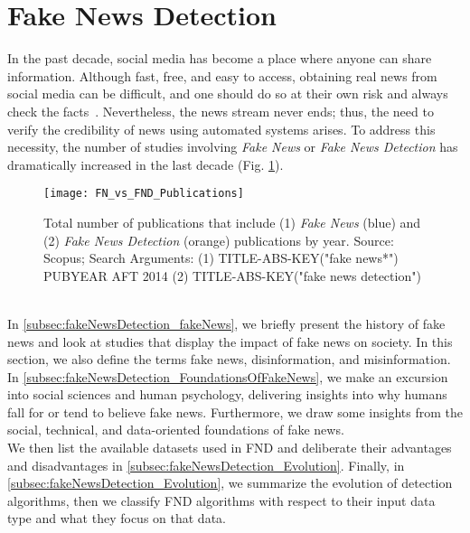 \section{Fake News Detection}
\label{sec:fakeNewsDetection}
In the past decade, social media has become a place where anyone can share information. Although fast, free, and easy to access, obtaining real news from social media can be difficult, and one should do so at their own risk and always check the facts~\parencite{SocialMediaAndFakeNewsIn2016Election_Allcott,TheScienceOfFakeNews_Lazer}. Nevertheless, the news stream never ends; thus, the need to verify the credibility of news using automated systems arises. To address this necessity, the number of studies involving \emph{Fake News} or \emph{Fake News Detection} has dramatically increased in the last decade (Fig. \ref{fig:FN_vs_FND_Publications}).
\begin{figure}
    \centering
    \texttt{[image: FN\_vs\_FND\_Publications]}
    \caption[Fake News and Fake News Detection Publications by Year]{Total number of publications that include (1) \emph{Fake News} (blue) and (2) \emph{Fake News Detection} (orange) publications by year. Source: Scopus; Search Arguments: (1) TITLE-ABS-KEY("fake news*") PUBYEAR AFT 2014 (2) TITLE-ABS-KEY("fake news detection")}\label{fig:FN_vs_FND_Publications}
\end{figure}\\
In \ref{subsec:fakeNewsDetection_fakeNews}, we briefly present the history of fake news and look at studies that display the impact of fake news on society. In this section, we also define the terms fake news, disinformation, and misinformation. \\
In \ref{subsec:fakeNewsDetection_FoundationsOfFakeNews}, we make an excursion into social sciences and human psychology, delivering insights into why humans fall for or tend to believe fake news. Furthermore, we draw some insights from the social, technical, and data-oriented foundations of fake news.\\
We then list the available datasets used in FND and deliberate their advantages and disadvantages in \ref{subsec:fakeNewsDetection_Evolution}. Finally, in \ref{subsec:fakeNewsDetection_Evolution}, we summarize the evolution of detection algorithms, then we classify FND algorithms with respect to their input data type and what they focus on that data.

